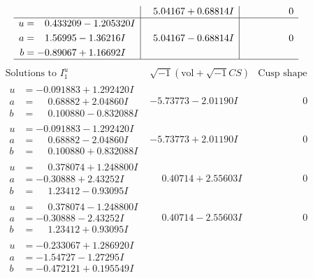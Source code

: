 \documentclass[1p]{elsarticle_modified}
\theoremstyle{definition}
\newcommand{\I}{\sqrt{-1}}
\begin{document}
$$\begin{array}{c|c|c}
 & \phantom{-}5.04167 + 0.68814 I & \phantom{-0.000000 } 0 \\ \hline\begin{aligned}
u &= \phantom{-}0.433209 - 1.205320 I \\
a &= \phantom{-}1.56995 - 1.36216 I \\
b &= -0.89067 + 1.16692 I\end{aligned}
 & \phantom{-}5.04167 - 0.68814 I & \phantom{-0.000000 } 0\\
 \hline 
 \end{array}$$\newpage$$\begin{array}{c|c|c}  
\text{Solutions to }I^u_{1}& \I (\text{vol} + \sqrt{-1}CS) & \text{Cusp shape}\\
 \hline 
\begin{aligned}
u &= -0.091883 + 1.292420 I \\
a &= \phantom{-}0.68882 + 2.04860 I \\
b &= \phantom{-}0.100880 - 0.832088 I\end{aligned}
 & -5.73773 - 2.01190 I & \phantom{-0.000000 } 0 \\ \hline\begin{aligned}
u &= -0.091883 - 1.292420 I \\
a &= \phantom{-}0.68882 - 2.04860 I \\
b &= \phantom{-}0.100880 + 0.832088 I\end{aligned}
 & -5.73773 + 2.01190 I & \phantom{-0.000000 } 0 \\ \hline\begin{aligned}
u &= \phantom{-}0.378074 + 1.248800 I \\
a &= -0.30888 + 2.43252 I \\
b &= \phantom{-}1.23412 - 0.93095 I\end{aligned}
 & \phantom{-}0.40714 + 2.55603 I & \phantom{-0.000000 } 0 \\ \hline\begin{aligned}
u &= \phantom{-}0.378074 - 1.248800 I \\
a &= -0.30888 - 2.43252 I \\
b &= \phantom{-}1.23412 + 0.93095 I\end{aligned}
 & \phantom{-}0.40714 - 2.55603 I & \phantom{-0.000000 } 0 \\ \hline\begin{aligned}
u &= -0.233067 + 1.286920 I \\
a &= -1.54727 - 1.27295 I \\
b &= -0.472121 + 0.195549 I\end{aligned}

\end{array}$$
\end{document}

